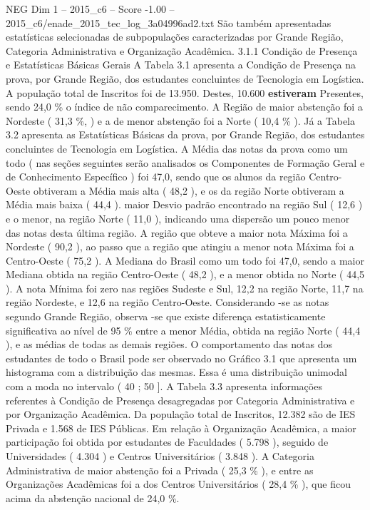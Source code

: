 \begin{textsample}{NEG Dim 1 – 2015\_c6 – Score -1.00 – 2015\_c6/enade\_2015\_tec\_log\_3a04996ad2.txt}
São também apresentadas estatísticas selecionadas de subpopulações caracterizadas por Grande Região, Categoria Administrativa e Organização Acadêmica. 3.1.1 Condição de Presença e Estatísticas Básicas Gerais A Tabela 3.1 apresenta a Condição de Presença na prova, por Grande Região, dos estudantes concluintes de Tecnologia em Logística.
A população total de Inscritos foi de 13.950.
Destes, 10.600 \textbf{estiveram} Presentes, sendo 24,0 \% o índice de não comparecimento.
A Região de maior abstenção foi a Nordeste ( 31,3 \%, ) e a de menor abstenção foi a Norte ( 10,4 \% ).
Já a Tabela 3.2 apresenta as Estatísticas Básicas da prova, por Grande Região, dos estudantes concluintes de Tecnologia em Logística.
A Média das notas da prova como um todo ( nas seções seguintes serão analisados os Componentes de Formação Geral e de Conhecimento Específico ) foi 47,0, sendo que os alunos da região Centro-Oeste obtiveram a Média mais alta ( 48,2 ), e os da região Norte obtiveram a Média mais baixa ( 44,4 ). maior Desvio padrão encontrado na região Sul ( 12,6 ) e o menor, na região Norte ( 11,0 ), indicando uma dispersão um pouco menor das notas desta última região.
A região que obteve a maior nota Máxima foi a Nordeste ( 90,2 ), ao passo que a região que atingiu a menor nota Máxima foi a Centro-Oeste ( 75,2 ).
A Mediana do Brasil como um todo foi 47,0, sendo a maior Mediana obtida na região Centro-Oeste ( 48,2 ), e a menor obtida no Norte ( 44,5 ).
A nota Mínima foi zero nas regiões Sudeste e Sul, 12,2 na região Norte, 11,7 na região Nordeste, e 12,6 na região Centro-Oeste.
Considerando -se as notas segundo Grande Região, observa -se que existe diferença estatisticamente significativa ao nível de 95 \% entre a menor Média, obtida na região Norte ( 44,4 ), e as médias de todas as demais regiões.
O comportamento das notas dos estudantes de todo o Brasil pode ser observado no Gráfico 3.1 que apresenta um histograma com a distribuição das mesmas.
Essa é uma distribuição unimodal com a moda no intervalo ( 40 ; 50 ].
A Tabela 3.3 apresenta informações referentes à Condição de Presença desagregadas por Categoria Administrativa e por Organização Acadêmica.
Da população total de Inscritos, 12.382 são de IES Privada e 1.568 de IES Públicas.
Em relação à Organização Acadêmica, a maior participação foi obtida por estudantes de Faculdades ( 5.798 ), seguido de Universidades ( 4.304 ) e Centros Universitários ( 3.848 ).
A Categoria Administrativa de maior abstenção foi a Privada ( 25,3 \% ), e entre as Organizações Acadêmicas foi a dos Centros Universitários ( 28,4 \% ), que ficou acima da abstenção nacional de 24,0 \%.

\end{textsample}
